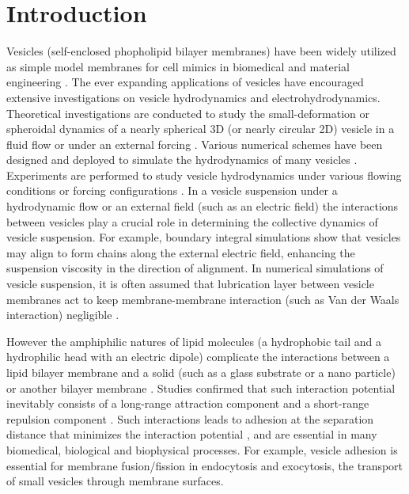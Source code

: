 \documentclass[%
preprint,
 amsmath,amssymb,
 aps,
]{revtex4-1}
\begin{document}



\section{Introduction}
Vesicles (self-enclosed phopholipid bilayer membranes) have been widely utilized
as simple model membranes for cell mimics in biomedical and material engineering \cite{}. 
%
The ever expanding applications of vesicles have encouraged extensive investigations on vesicle hydrodynamics
and electrohydrodynamics.
Theoretical investigations are conducted to study the small-deformation or spheroidal dynamics of a nearly spherical  3D (or nearly circular 2D) vesicle in a fluid flow or under an external forcing \cite{Barthes-BieselRallison1981_JFM,Misbah2006_PRL,Vlahovska2007_PRE,Finken2008_EPL,ZhangZahnTanLin2013_PoF,Nganguia2013_PRE}. 
Various numerical schemes have been designed and deployed to simulate the hydrodynamics of many vesicles \cite{BagchiJohoson2005_JBE,Biben2005_EJP,Veerapaneni2009_JCP,SeolHuKimLai2016_JCP}.  
Experiments are performed to study vesicle hydrodynamics under various flowing conditions or forcing configurations \cite{MaderVitkova2006_EurPhysJE, Abkarian2008_SoftMatt,DahlNarsimhanGouveia2016_SoftMatt}. In a vesicle suspension under 
a hydrodynamic flow or an external field (such as an electric field) 
the interactions between
vesicles play a crucial role in determining the collective dynamics of
vesicle suspension. For example, boundary integral simulations show that
vesicles may align to form chains along the external electric field,
enhancing the suspension viscosity in the direction of alignment.
In numerical simulations of vesicle suspension, it is often assumed that lubrication layer between vesicle membranes act to keep
membrane-membrane interaction (such as Van der Waals interaction) negligible \cite{BagchiJohoson2005_JBE,Veerapaneni2009_JCP}.

However the amphiphilic natures of lipid molecules (a hydrophobic tail and a hydrophilic head with an electric dipole) complicate the
interactions between a lipid bilayer membrane and a solid (such as a glass substrate or a nano particle) or another bilayer membrane \cite{EvansMetcalfe1984_BJ,Book_PhysicalBasisCellAdhesion,Book_IntermolecularSurfaceForces}.
Studies confirmed that such interaction potential inevitably consists of a long-range attraction component and a short-range repulsion component 
\cite{Book_IntermolecularSurfaceForces}. Such interactions leads to adhesion at the separation distance that minimizes the
interaction potential \cite{Book_IntermolecularSurfaceForces}, and are essential in many biomedical, biological and biophysical processes.
For example, vesicle adhesion
is essential for membrane fusion/fission in endocytosis and exocytosis, the transport of small
vesicles through membrane surfaces.
\end{document}
